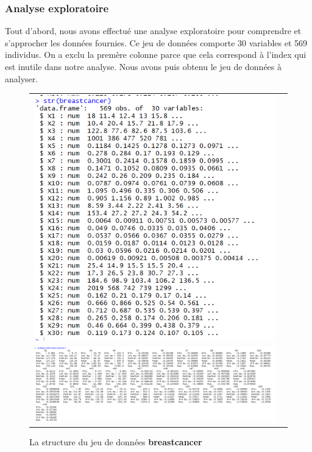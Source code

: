 \documentclass[a4paper,11pt,oneside,roman]{article}
\begin{document}
\subsubsection{Analyse exploratoire}
Tout d'abord, nous avons effectué une analyse exploratoire pour comprendre et s'approcher les données fournies. \newline
Ce jeu de données comporte 30 variables et 569 individus. On a exclu la premère colonne parce que cela correspond à l'index qui est inutile dans notre analyse. Nous avons puis obtenu le jeu de données à analyser.\newline
\begin{figure}[h]
    \centering
    \begin{tabular}{cc}
    \includegraphics[scale = .6]{./discrimination/breastcancer/structure.PNG} \\
    \includegraphics[scale = .5]{discrimination/breastcancer/summary.PNG}
    \end{tabular}
    \caption{La structure du jeu de données \textbf{breastcancer}}
    \label{fig:my_label}
\end{figure}
\end{document}

